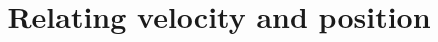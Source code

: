 \documentclass{ximera}
\title[Dig-In:]{Relating velocity and position}
\begin{document}
\begin{abstract}
\end{abstract}
\maketitle


  
\end{document}
